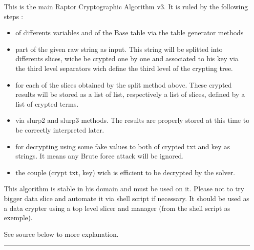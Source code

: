 \documentclass[letterpaper,10pt,english]{sphinxmanual}
\begin{document}
\sphinxAtStartPar
This is the main Raptor Cryptographic Algorithm v3. It is ruled by the following steps :
\begin{itemize}
\item {} 
\sphinxAtStartPar
{} of differents variables and of the Base table via the table generator methods

\item {} 
\sphinxAtStartPar
{} part of the given raw string as input. This string will be splitted into differents slices, wiche be crypted one by one and associated to his key via the third level separators wich define the third level of the crypting tree.

\item {} 
\sphinxAtStartPar
{} for each of the slices obtained by the split method above. These crypted results will be stored as a list of list, respectively a list of slices, defined by a list of crypted terms.

\item {} 
\sphinxAtStartPar
{} via slurp2 and slurp3 methods. The results are properly stored at this time to be correctly interpreted later.

\item {} 
\sphinxAtStartPar
{} for decrypting using some fake values to both of crypted txt and key as strings. It means any Brute force attack will be ignored.

\item {} 
\sphinxAtStartPar
{} the couple (crypt txt, key) wich is efficient to be decrypted by the solver.

\end{itemize}

\sphinxAtStartPar
This algorithm is stable in his domain and must be used on it.
Please not to try bigger data slice and automate it via shell script if necessary.
It should be used as a data crypter using a top level slicer and manager (from the shell script as exemple).

\sphinxAtStartPar
See source below to more explanation.


\bigskip\hrule\bigskip
\end{document}
